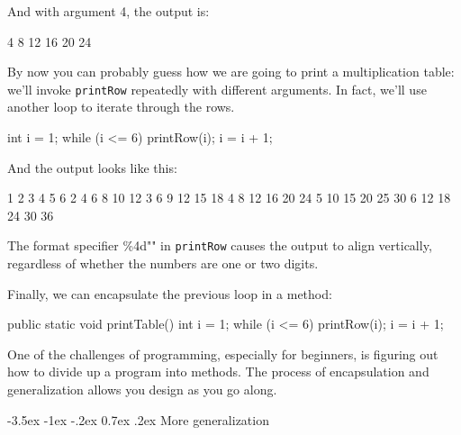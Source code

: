 \documentclass[12pt]{book}
\makeatletter
\theoremstyle{exercise}
\newcommand{\java}[1]{\verb"#1"}
\renewcommand{\section}{\@startsection{section}{1}{\z@}%
    {-3.5ex \@plus -1ex \@minus -.2ex}%
    {0.7ex \@plus.2ex}%
    {\normalfont\Large\bfseries}}
\newcommand{\java}[1]{\lstinline{#1}} %
\makeatother
\begin{document}
And with argument 4, the output is:

\begin{stdout}
    4    8   12   16   20   24
\end{stdout}

By now you can probably guess how we are going to print a multiplication table: we'll invoke \java{printRow} repeatedly with different arguments.
In fact, we'll use another loop to iterate through the rows.

\begin{code}
    int i = 1;
    while (i <= 6) {
        printRow(i);
        i = i + 1;
    }
\end{code}

And the output looks like this:

\begin{stdout}
    1    2    3    4    5    6
    2    4    6    8   10   12
    3    6    9   12   15   18
    4    8   12   16   20   24
    5   10   15   20   25   30
    6   12   18   24   30   36
\end{stdout}

The format specifier \java{"\%4d"} in \java{printRow} causes the output to align vertically, regardless of whether the numbers are one or two digits.

Finally, we can encapsulate the previous loop in a method:

\begin{code}
    public static void printTable() {
        int i = 1;
        while (i <= 6) {
            printRow(i);
            i = i + 1;
        }
    }
\end{code}


One of the challenges of programming, especially for beginners, is figuring out how to divide up a program into methods.
The process of encapsulation and generalization allows you design as you go along.




\section{More generalization}
\end{document}
